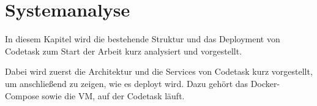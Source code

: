 \chapter{Systemanalyse}

In diesem Kapitel wird die bestehende Struktur und das Deployment von Codetask zum Start der Arbeit kurz analysiert und vorgestellt.

Dabei wird zuerst die Architektur und die Services von Codetask kurz vorgestellt, um anschließend zu zeigen, wie es deployt wird. Dazu gehört das Docker-Compose sowie die VM, auf der Codetask läuft.


